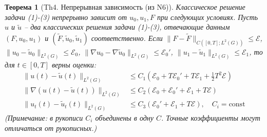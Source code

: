 \documentclass[12pt, a4paper]{article}
\newtheorem{theorem}{Теорема}[section] %
\begin{document}
\begin{theorem}[Th4. Непрерывная зависимость (из N6)]
\label{thm:continuous_dependence}
Классическое решение задачи (1)-(3) непрерывно зависит от $u_0, u_1, F$ при следующих условиях.
Пусть $u$ и $\tilde{u}$ -- два классических решения задачи (1)-(3), отвечающие данным $(F, u_0, u_1)$ и $(\tilde{F}, \tilde{u}_0, \tilde{u}_1)$ соответственно.
Если $\|F - \tilde{F}\|_{C([0,T]; L^2(G))} \le \mathcal{E}$, $\|u_0 - \tilde{u}_0\|_{L^2(G)} \le \mathcal{E}_0$, $\|\nabla u_0 - \nabla \tilde{u}_0\|_{L^2(G)} \le \mathcal{E}_0'$, $\|u_1 - \tilde{u}_1\|_{L^2(G)} \le \mathcal{E}_1$,
то для $t \in [0,T]$ верны оценки:
\begin{align}
\|u(t) - \tilde{u}(t)\|_{L^2(G)} &\le C_1 (\mathcal{E}_0 + T \mathcal{E}_0' + T \mathcal{E}_1 + \frac{1}{2} T^2 \mathcal{E}) \label{eq:cont_dep_u} \\
\|\nabla (u(t) - \tilde{u}(t))\|_{L^2(G)} &\le C_2 (\mathcal{E}_0 + \mathcal{E}_0' + \mathcal{E}_1 + T \mathcal{E}) \label{eq:cont_dep_gradu} \\
\|u_t(t) - \tilde{u}_t(t)\|_{L^2(G)} &\le C_3 (\mathcal{E}_0' + \mathcal{E}_1 + T \mathcal{E}), \quad C_i = \text{const} \label{eq:cont_dep_ut}
\end{align}
(Примечание: в рукописи $C_i$ объединены в одну $C$. Точные коэффициенты могут отличаться от рукописных.)
\end{theorem}
\end{document}
